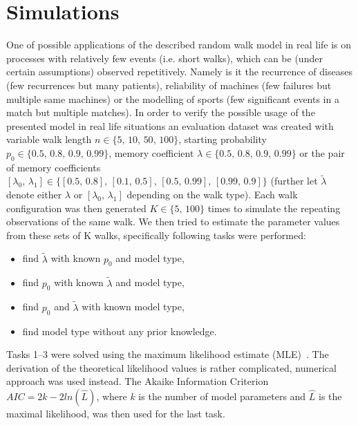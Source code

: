 \documentclass{amsart}
\theoremstyle{definition}
\theoremstyle{plain}
\theoremstyle{plain}
\theoremstyle{plain}
\numberwithin{equation}{section}
\begin{document}
    \section{Simulations}\label{sec:Simulations}

    One of possible applications of the described random walk model in real life is on processes with relatively few events (i.e. short walks), which can be (under certain assumptions) observed repetitively.
    Namely is it the recurrence of diseases (few recurrences but many patients), reliability of machines (few failures but multiple same machines) or the modelling of sports (few significant events in a match but multiple matches).
    In order to verify the possible usage of the presented model in real life situations an evaluation dataset was created with variable walk length $n\in\{5,\,10,\,50,\,100\}$, starting probability $p_{0}\in\{0.5,\,0.8,\,0.9,\,0.99\}$,
    memory coefficient $\lambda\in\{0.5,\,0.8,\,0.9,\,0.99\}$ or the pair of memory coefficients $[\lambda_{0},\,\lambda_{1}]\in\{[0.5,\,0.8],\,[0.1,\,0.5],\,[0.5,\,0.99],\,[0.99,\,0.9]\}$
    (further let $\tilde{\lambda}$ denote either $\lambda$ or $[\lambda_{0},\,\lambda_{1}]$ depending on the walk type).
    Each walk configuration was then generated $K\in\{5,\,100\}$ times to simulate the repeating observations of the same walk.
    We then tried to estimate the parameter values from these sets of K walks, specifically following tasks were performed:

    \begin{itemize}
        \item find $\tilde{\lambda}$ with known $p_{0}$ and model type,
        \item find $p_{0}$ with known $\tilde{\lambda}$ and model type,
        \item find $p_{0}$ and $\tilde{\lambda}$ with known model type,
        \item find model type without any prior knowledge.
    \end{itemize}

    Tasks 1--3 were solved using the maximum likelihood estimate (MLE)~\cite{rossi2018mathematical}.
    The derivation of the theoretical likelihood values is rather complicated, numerical approach was used instead.
    The Akaike Information Criterion $AIC=2k-2ln(\hat{L})$, where $k$ is the number of model parameters and $\hat{L}$ is the maximal likelihood, was then used for the last task.
\end{document}
